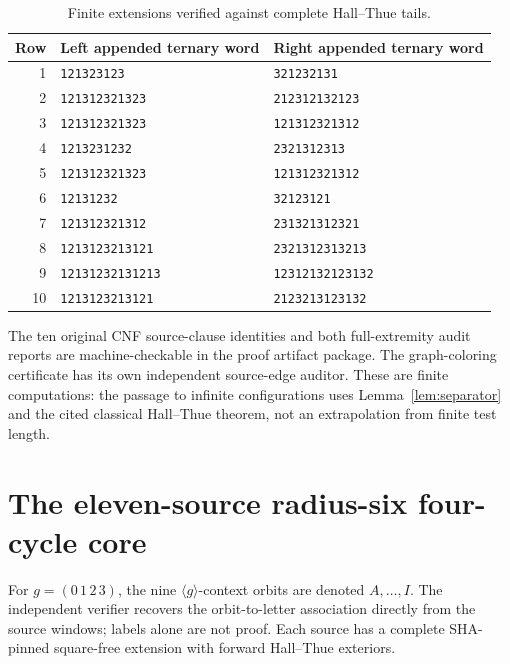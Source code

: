 \documentclass[11pt]{article}
\theoremstyle{remark}
\begin{document}
\begin{table}[ht]
\centering
\scriptsize
\begin{tabular}{rll}
\toprule
Row & Left appended ternary word & Right appended ternary word\\
\midrule
1 & \texttt{121323123} & \texttt{321232131}\\
2 & \texttt{121312321323} & \texttt{212312132123}\\
3 & \texttt{121312321323} & \texttt{121312321312}\\
4 & \texttt{1213231232} & \texttt{2321312313}\\
5 & \texttt{121312321323} & \texttt{121312321312}\\
6 & \texttt{12131232} & \texttt{32123121}\\
7 & \texttt{121312321312} & \texttt{231321312321}\\
8 & \texttt{1213123213121} & \texttt{2321312313213}\\
9 & \texttt{12131232131213} & \texttt{12312132123132}\\
10 & \texttt{1213123213121} & \texttt{2123213123132}\\
\bottomrule
\end{tabular}
\caption{Finite extensions verified against complete Hall--Thue tails.}
\label{tab:pads}
\end{table}

The ten original CNF source-clause identities and both full-extremity
audit reports are machine-checkable in the proof artifact package.
The graph-coloring certificate has its own independent source-edge
auditor. These are finite computations: the passage to infinite
configurations uses Lemma~\ref{lem:separator} and the cited classical
Hall--Thue theorem, not an extrapolation from finite test length.

\clearpage
\section{The eleven-source radius-six four-cycle core}
For $g=(0\,1\,2\,3)$, the nine
$\langle g\rangle$-context orbits are denoted
$A,\ldots,I$. The independent verifier recovers
the orbit-to-letter association directly from
the source windows; labels alone are not proof.
Each source has a complete SHA-pinned square-free
extension with forward Hall--Thue exteriors.
\end{document}
